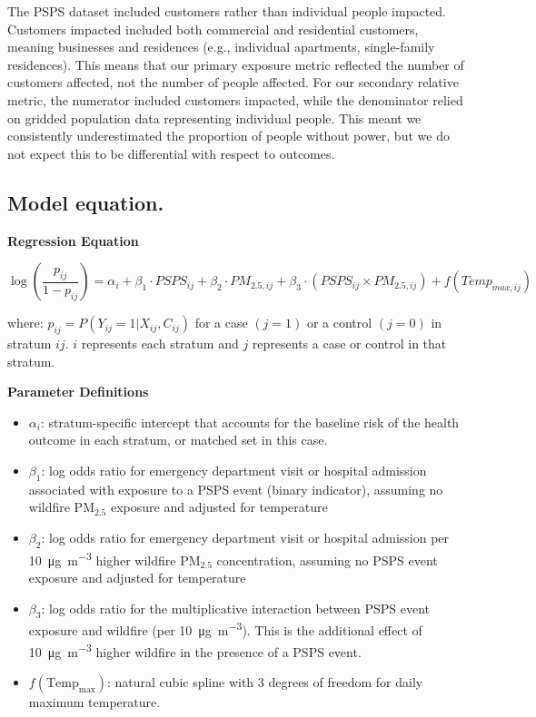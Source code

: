\documentclass[../main.tex]{subfiles}
\begin{document}
The PSPS dataset included customers rather than individual people impacted. Customers impacted included both commercial and residential customers, meaning businesses and residences (e.g., individual apartments, single-family residences). This means that our primary exposure metric reflected the number of customers affected, not the number of people affected. For our secondary relative metric, the numerator included customers impacted, while the denominator relied on gridded population data representing individual people. This meant we consistently underestimated the proportion of people without power, but we do not expect this to be differential with respect to outcomes. 

\subsection{Model equation.}

\textbf{Regression Equation}

\begin{equation}
\log\left(\frac{p_{ij}}{1-p_{ij}}\right) = \alpha_i + \beta_1 \cdot PSPS_{ij} + \beta_2 \cdot PM_{2.5,ij} + \beta_3 \cdot (PSPS_{ij} \times PM_{2.5,ij}) + f(Temp_{max,ij})
\end{equation}

where: $p_{ij} = P(Y_{ij} = 1 | X_{ij}, C_{ij})$ for a case $(j = 1)$ or a control $(j = 0)$ in stratum $ij$. $i$ represents each stratum and $j$ represents a case or control in that stratum.

\vspace{1em}

\textbf{Parameter Definitions}

\begin{itemize}
\item $\alpha_i$: stratum-specific intercept that accounts for the baseline risk of the health outcome in each stratum, or matched set in this case. 
\item $\beta_1$: log odds ratio for emergency department visit or hospital admission associated with exposure to a PSPS event (binary indicator), assuming no wildfire PM$_{2.5}$ exposure and adjusted for temperature
\item $\beta_2$: log odds ratio for emergency department visit or hospital admission per \SI[per-mode=symbol]{10}{\micro\gram\per\cubic\metre} higher wildfire PM$_{2.5}$ concentration, assuming no PSPS event exposure and adjusted for temperature
\item $\beta_3$: log odds ratio for the multiplicative interaction between PSPS event exposure and wildfire \PM (per \SI[per-mode=symbol]{10}{\micro\gram\per\cubic\metre}). This is the additional effect of \SI[per-mode=symbol]{10}{\micro\gram\per\cubic\metre} higher wildfire \PM in the presence of a PSPS event. 
\item $f(\mathrm{Temp_{max}})$: natural cubic spline with 3 degrees of freedom for daily maximum temperature.
\end{itemize}
\end{document}
